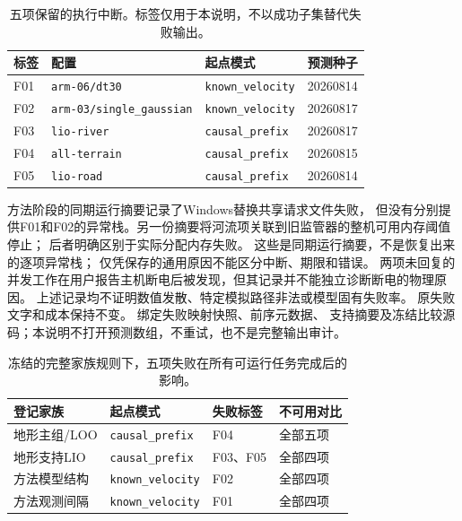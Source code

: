 \begin{table}[htbp]
\centering\small
\caption{五项保留的执行中断。标签仅用于本说明，不以成功子集替代失败输出。}
\label{tab:retained-failures}\hypertarget{tab:retained-failures}{}
\begin{tabular}{llll}
\toprule
标签 & 配置 & 起点模式 & 预测种子\\
\midrule
F01 & \texttt{arm-06/dt30} & \texttt{known\_velocity} & 20260814\\
F02 & \texttt{arm-03/single\_gaussian} & \texttt{known\_velocity} & 20260817\\
F03 & \texttt{lio-river} & \texttt{causal\_prefix} & 20260817\\
F04 & \texttt{all-terrain} & \texttt{causal\_prefix} & 20260815\\
F05 & \texttt{lio-road} & \texttt{causal\_prefix} & 20260814\\
\bottomrule
\end{tabular}
\end{table}

方法阶段的同期运行摘要记录了Windows替换共享请求文件失败，
但没有分别提供F01和F02的异常栈。另一份摘要将河流项关联到旧监管器的整机可用内存阈值停止；
后者明确区别于实际分配内存失败。
这些是同期运行摘要，不是恢复出来的逐项异常栈；
仅凭保存的通用原因不能区分中断、期限和错误。
两项未回复的并发工作在用户报告主机断电后被发现，但其记录并不能独立诊断断电的物理原因。
上述记录均不证明数值发散、特定模拟路径非法或模型固有失败率。
原失败文字和成本保持不变。
 绑定失败映射快照、前序元数据、
支持摘要及冻结比较源码；本说明不打开预测数组，不重试，也不是完整输出审计。

\begin{table}[htbp]
\centering\small
\caption{冻结的完整家族规则下，五项失败在所有可运行任务完成后的影响。}
\label{tab:failure-family-dispositions}\hypertarget{tab:failure-family-dispositions}{}
\begin{tabular}{llll}
\toprule
登记家族 & 起点模式 & 失败标签 & 不可用对比\\
\midrule
地形主组/LOO & \texttt{causal\_prefix} & F04 & 全部五项\\
地形支持LIO & \texttt{causal\_prefix} & F03、F05 & 全部四项\\
方法模型结构 & \texttt{known\_velocity} & F02 & 全部四项\\
方法观测间隔 & \texttt{known\_velocity} & F01 & 全部四项\\
\bottomrule
\end{tabular}
\end{table}


